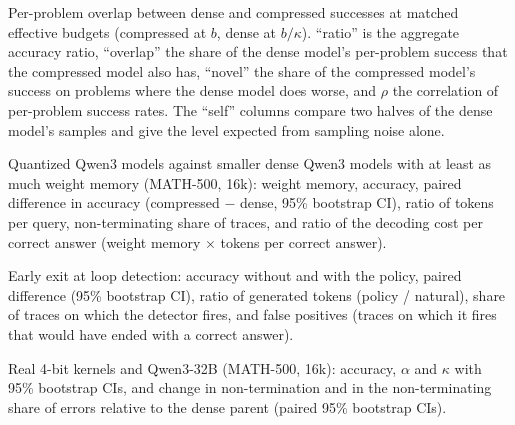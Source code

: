 \documentclass[10pt]{article}
\begin{document}
\begin{table}[t]
  \centering\scriptsize\setlength{\tabcolsep}{3pt}
  \caption{Per-problem overlap between dense and compressed successes at matched effective budgets (compressed at $b$, dense at $b/\kappa$). ``ratio'' is the aggregate accuracy ratio, ``overlap'' the share of the dense model's per-problem success that the compressed model also has, ``novel'' the share of the compressed model's success on problems where the dense model does worse, and $\rho$ the correlation of per-problem success rates. The ``self'' columns compare two halves of the dense model's samples and give the level expected from sampling noise alone.}
  \label{tab:overlap}
\end{table}

\begin{table}[t]
  \centering\scriptsize\setlength{\tabcolsep}{3pt}
  \caption{Quantized Qwen3 models against smaller dense Qwen3 models with at least as much weight memory (MATH-500, 16k): weight memory, accuracy, paired difference in accuracy (compressed $-$ dense, 95\% bootstrap CI), ratio of tokens per query, non-terminating share of traces, and ratio of the decoding cost per correct answer (weight memory $\times$ tokens per correct answer).}
  \label{tab:memory}
\end{table}

\begin{table}[t]
  \centering\scriptsize\setlength{\tabcolsep}{3pt}
  \caption{Early exit at loop detection: accuracy without and with the policy, paired difference (95\% bootstrap CI), ratio of generated tokens (policy / natural), share of traces on which the detector fires, and false positives (traces on which it fires that would have ended with a correct answer).}
  \label{tab:earlyexit}
\end{table}

\begin{table}[t]
  \centering\scriptsize\setlength{\tabcolsep}{3pt}
  \caption{Real 4-bit kernels and Qwen3-32B (MATH-500, 16k): accuracy, $\alpha$ and $\kappa$ with 95\% bootstrap CIs, and change in non-termination and in the non-terminating share of errors relative to the dense parent (paired 95\% bootstrap CIs).}
  \label{tab:robust}
\end{table}
\end{document}
